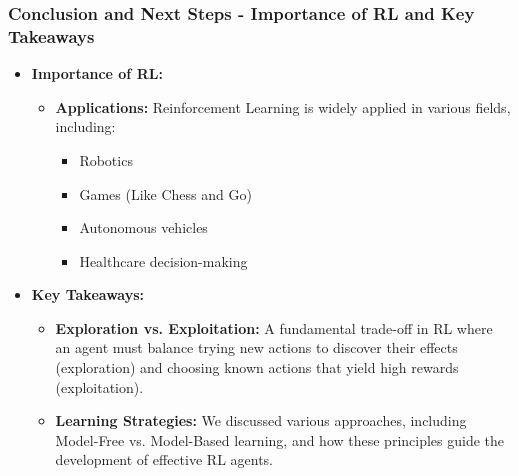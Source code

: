 \documentclass[aspectratio=169]{beamer}
\begin{document}
\begin{frame}[fragile]
    \frametitle{Conclusion and Next Steps - Importance of RL and Key Takeaways}

    \begin{itemize}
        \item \textbf{Importance of RL:}
        \begin{itemize}
            \item \textbf{Applications:} Reinforcement Learning is widely applied in various fields, including:
            \begin{itemize}
                \item Robotics
                \item Games (Like Chess and Go)
                \item Autonomous vehicles
                \item Healthcare decision-making
            \end{itemize}
        \end{itemize}
        
        \item \textbf{Key Takeaways:}
        \begin{itemize}
            \item \textbf{Exploration vs. Exploitation:} A fundamental trade-off in RL where an agent must balance trying new actions to discover their effects (exploration) and choosing known actions that yield high rewards (exploitation).
            \item \textbf{Learning Strategies:} We discussed various approaches, including Model-Free vs. Model-Based learning, and how these principles guide the development of effective RL agents.
        \end{itemize}
    \end{itemize}
\end{frame}
\end{document}
